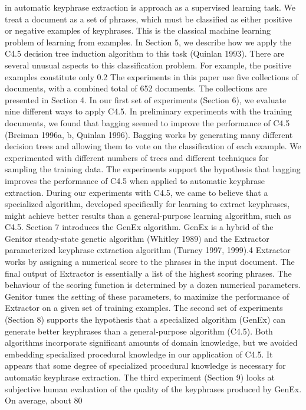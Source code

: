 in \cite{turney2000}  automatic keyphrase extraction is approach as a supervised learning task. We treat a document as a set of phrases, which must be classified as either positive or negative examples 
of keyphrases. This is the classical machine learning problem of learning from examples. In Section 5, we describe how we apply the C4.5 decision tree induction algorithm to this task (Quinlan 1993). There are several unusual aspects to this classification problem. For example, the positive examples constitute only 0.2%
The experiments in this paper use five collections of documents, with a combined total of 652 documents. The collections are presented in Section 4. In our first set of experiments (Section 6), we evaluate nine different ways to apply C4.5. In preliminary experiments with the training documents, we found that bagging seemed to improve the performance of C4.5 (Breiman 1996a, b, Quinlan 1996). Bagging works by generating many different decision trees and allowing them to vote on the classification of each example. We experimented with different numbers of trees and different techniques for sampling the training data. The experiments support the hypothesis that bagging improves the performance of C4.5 when applied to automatic keyphrase extraction.
During our experiments with C4.5, we came to believe that a specialized algorithm, developed specifically for learning to extract keyphrases, might achieve better results than a general-purpose learning algorithm, such as C4.5. Section 7 introduces the GenEx algorithm. GenEx is a hybrid of the Genitor steady-state genetic algorithm (Whitley 1989) and the Extractor parameterized keyphrase extraction algorithm (Turney 1997, 1999).4 Extractor works by assigning a numerical score to the phrases in the input document. The final output of Extractor is essentially a list of the highest scoring phrases. The behaviour of the scoring function is determined by a dozen numerical parameters. Genitor tunes the setting of these parameters, to maximize the performance of Extractor on a given set of training examples.
The second set of experiments (Section 8) supports the hypothesis that a specialized algorithm (GenEx) can generate better keyphrases than a general-purpose algorithm (C4.5). Both algorithms incorporate significant amounts of domain knowledge, but we avoided embedding specialized procedural knowledge in our application of C4.5. It appears that some degree of specialized procedural knowledge is necessary for automatic keyphrase extraction.
The third experiment (Section 9) looks at subjective human evaluation of the quality of the keyphrases produced by GenEx. On average, about 80%




